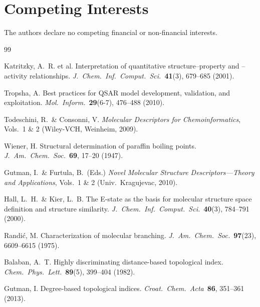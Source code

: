 \documentclass[12pt,a4paper]{article}
\begin{document}
\section*{Competing Interests}
The authors declare no competing financial or non-financial interests.

\begin{thebibliography}{99}

Katritzky, A.~R. et al.
Interpretation of quantitative structure--property and --activity relationships.
\textit{J.\ Chem.\ Inf.\ Comput.\ Sci.}\ \textbf{41}(3), 679--685 (2001).

Tropsha, A.
Best practices for QSAR model development, validation, and exploitation.
\textit{Mol.\ Inform.}\ \textbf{29}(6-7), 476--488 (2010).

Todeschini, R.\ \& Consonni, V.
\textit{Molecular Descriptors for Chemoinformatics}, Vols.~1 \& 2 (Wiley-VCH, Weinheim, 2009).

Wiener, H.
Structural determination of paraffin boiling points.
\textit{J.\ Am.\ Chem.\ Soc.}\ \textbf{69}, 17--20 (1947).

Gutman, I.\ \& Furtula, B.\ (Eds.)
\textit{Novel Molecular Structure Descriptors---Theory and Applications}, Vols.~1 \& 2 (Univ.\ Kragujevac, 2010).

Hall, L.~H.\ \& Kier, L.~B.
The E-state as the basis for molecular structure space definition and structure similarity.
\textit{J.\ Chem.\ Inf.\ Comput.\ Sci.}\ \textbf{40}(3), 784--791 (2000).

Randi\'{c}, M.
Characterization of molecular branching.
\textit{J.\ Am.\ Chem.\ Soc.}\ \textbf{97}(23), 6609--6615 (1975).

Balaban, A.~T.
Highly discriminating distance-based topological index.
\textit{Chem.\ Phys.\ Lett.}\ \textbf{89}(5), 399--404 (1982).

Gutman, I.
Degree-based topological indices.
\textit{Croat.\ Chem.\ Acta}\ \textbf{86}, 351--361 (2013).


\end{thebibliography}
\end{document}
